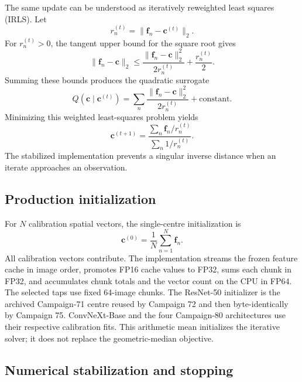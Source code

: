 The same update can be understood as iteratively reweighted least squares
(IRLS). Let
\begin{equation}
    r_n^{(t)}=\|\bm f_n-\bm c^{(t)}\|_2.
\end{equation}
For $r_n^{(t)}>0$, the tangent upper bound for the square root gives
\begin{equation}
    \|\bm f_n-\bm c\|_2
    \leq
    \frac{\|\bm f_n-\bm c\|_2^2}{2r_n^{(t)}}
    +\frac{r_n^{(t)}}{2}.
\end{equation}
Summing these bounds produces the quadratic surrogate
\begin{equation}
    Q(\bm c\mid\bm c^{(t)})
    =\sum_n
      \frac{\|\bm f_n-\bm c\|_2^2}{2r_n^{(t)}}
      +\text{constant}.
\end{equation}
Minimizing this weighted least-squares problem yields
\begin{equation}
    \bm c^{(t+1)}=
    \frac{\sum_n\bm f_n/r_n^{(t)}}
         {\sum_n1/r_n^{(t)}}.
\end{equation}
The stabilized implementation prevents a singular inverse distance when an
iterate approaches an observation.

\subsection{Production initialization}

For $N$ calibration spatial vectors, the single-centre initialization is
\begin{equation}
    \bm c^{(0)}=\frac{1}{N}\sum_{n=1}^{N}\bm f_n.
    \label{eq:kdgrp-production-init}
\end{equation}
All calibration vectors contribute. The implementation streams the frozen
feature cache in image order, promotes FP16 cache values to FP32, sums each
chunk in FP32, and accumulates chunk totals and the vector count on the CPU in
FP64. The selected taps use fixed 64-image chunks. The ResNet-50 initializer is
the archived Campaign-71 centre reused by Campaign 72 and then byte-identically
by Campaign 75. ConvNeXt-Base and the four Campaign-80 architectures use their
respective calibration fits. This arithmetic mean initializes the iterative
solver; it does not replace the geometric-median objective.

\subsection{Numerical stabilization and stopping}

